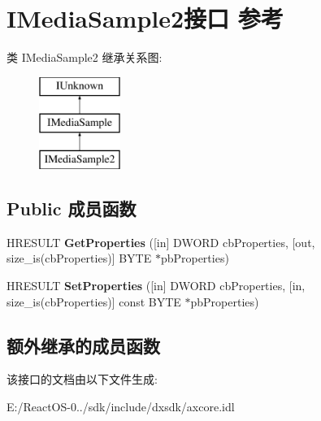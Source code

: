 \hypertarget{interface_i_media_sample2}{}\section{I\+Media\+Sample2接口 参考}
\label{interface_i_media_sample2}
类 I\+Media\+Sample2 继承关系图\+:\begin{figure}[H]
\begin{center}
\leavevmode
\includegraphics[height=3.000000cm]{interface_i_media_sample2}
\end{center}
\end{figure}
\subsection*{Public 成员函数}
\begin{DoxyCompactItemize}
\item 
\mbox{\label{interface_i_media_sample2_a8ce9bfe8d9fd201ee003b75954793a54}} 
H\+R\+E\+S\+U\+LT {\bfseries Get\+Properties} (\mbox{[}in\mbox{]} D\+W\+O\+RD cb\+Properties, \mbox{[}out, size\+\_\+is(cb\+Properties)\mbox{]} B\+Y\+TE $\ast$pb\+Properties)
\item 
\mbox{\label{interface_i_media_sample2_a3a88ea6dd7e7bcfe80f6b7c52af03153}} 
H\+R\+E\+S\+U\+LT {\bfseries Set\+Properties} (\mbox{[}in\mbox{]} D\+W\+O\+RD cb\+Properties, \mbox{[}in, size\+\_\+is(cb\+Properties)\mbox{]} const B\+Y\+TE $\ast$pb\+Properties)
\end{DoxyCompactItemize}
\subsection*{额外继承的成员函数}


该接口的文档由以下文件生成\+:\begin{DoxyCompactItemize}
\item 
E\+:/\+React\+O\+S-\/0../sdk/include/dxsdk/axcore.\+idl\end{DoxyCompactItemize}
